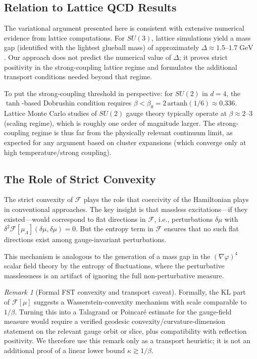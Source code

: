 \documentclass[12pt,a4paper]{article}
\theoremstyle{definition}
\theoremstyle{plain}
\theoremstyle{remark}
\newtheorem{remark}[definition]{Remark}
\begin{document}
\subsection{Relation to Lattice QCD Results}

The variational argument presented here is consistent with extensive numerical evidence from lattice computations. For $SU(3)$, lattice simulations yield a mass gap (identified with the lightest glueball mass) of approximately $\Delta \approx 1.5$--$1.7\;\mathrm{GeV}$ \cite{MorningstarPeardon1999, ChenXu2006}. Our approach does not predict the numerical value of $\Delta$; it proves strict positivity in the strong-coupling lattice regime and formulates the additional transport conditions needed beyond that regime.

To put the strong-coupling threshold in perspective: for $SU(2)$ in $d=4$, the $\tanh$-based Dobrushin condition requires $\beta < \beta_0 = 2\,\mathrm{artanh}(1/6) \approx 0.336$. Lattice Monte Carlo studies of $SU(2)$ gauge theory typically operate at $\beta \approx 2$--$3$ (scaling regime), which is roughly one order of magnitude larger. The strong-coupling regime is thus far from the physically relevant continuum limit, as expected for any argument based on cluster expansions (which converge only at high temperature/strong coupling).

\subsection{The Role of Strict Convexity}

The strict convexity of $\mathcal{F}$ plays the role that coercivity of the Hamiltonian plays in conventional approaches. The key insight is that massless excitations---if they existed---would correspond to flat directions in $\mathcal{F}$, i.e., perturbations $\delta\mu$ with $\delta^2 \mathcal{F}[\mu_\Lambda](\delta\mu, \delta\mu) = 0$. But the entropy term in $\mathcal{F}$ ensures that no such flat directions exist among gauge-invariant perturbations.

This mechanism is analogous to the generation of a mass gap in the $(\nabla\varphi)^4$ scalar field theory by the entropy of fluctuations, where the perturbative masslessness is an artifact of ignoring the full non-perturbative measure.

\begin{remark}[Formal FST convexity and transport caveat]
\label{rem:fst-convexity-talagrand}
Formally, the KL part of $\mathcal{F}[\mu]$ suggests a Wasserstein-convexity mechanism with scale comparable to $1/\beta$. Turning this into a Talagrand or Poincar\'e estimate for the gauge-field measure would require a verified geodesic convexity/curvature-dimension statement on the relevant gauge orbit or slice, plus compatibility with reflection positivity. We therefore use this remark only as a transport heuristic; it is not an additional proof of a linear lower bound $\kappa \gtrsim 1/\beta$.
\end{remark}
\end{document}
